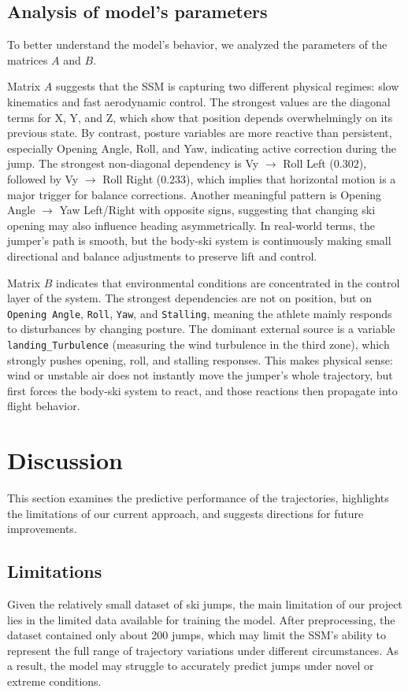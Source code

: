 \documentclass[sigconf]{acmart}
\begin{document}
\subsection{Analysis of model's parameters}
To better understand the model's behavior, we analyzed the parameters of the 
matrices $A$ and $B$. 

Matrix $A$ suggests that the SSM is capturing two different physical regimes: 
slow kinematics and fast aerodynamic control. The strongest values are the 
diagonal terms for X, Y, and Z, which show that position depends overwhelmingly 
on its previous state. By contrast, posture variables are more reactive than 
persistent, especially Opening Angle, Roll, and Yaw, indicating active correction 
during the jump. The strongest non-diagonal dependency is Vy $\rightarrow$  Roll Left ($0.302$), 
followed by Vy $\rightarrow$ Roll Right ($0.233$), which implies that horizontal motion is a major 
trigger for balance corrections. Another meaningful pattern is Opening Angle $\rightarrow$ Yaw 
Left/Right with opposite signs, suggesting that changing ski opening may also 
influence heading asymmetrically. In real-world terms, the jumper's path is smooth, 
but the body-ski system is continuously making small directional and balance adjustments 
to preserve lift and control.

Matrix $B$ indicates that environmental conditions are concentrated in the control layer 
of the system. The strongest dependencies are not on position, but on \texttt{Opening Angle}, 
\texttt{Roll}, \texttt{Yaw}, and \texttt{Stalling}, meaning the athlete mainly responds to 
disturbances by changing posture. The dominant external source is a variable
 \texttt{landing\_Turbulence} (measuring the wind turbulence in the third zone), which strongly pushes opening, roll, and stalling responses. 
This makes physical sense: wind or unstable air does not instantly move the jumper's whole 
trajectory, but first forces the body-ski system to react, and those reactions then propagate 
into flight behavior.

\section{Discussion}
This section examines the predictive performance of the trajectories, highlights
the limitations of our current approach, and suggests directions for future
improvements.

\subsection{Limitations}
Given the relatively small dataset of ski jumps, the main limitation of our
project lies in the limited data available for training the model. After
preprocessing, the dataset contained only about 200 jumps, which may limit the
SSM's ability to represent the full range of trajectory variations under
different circumstances. As a result, the model may struggle to accurately
predict jumps under novel or extreme conditions.
\end{document}

